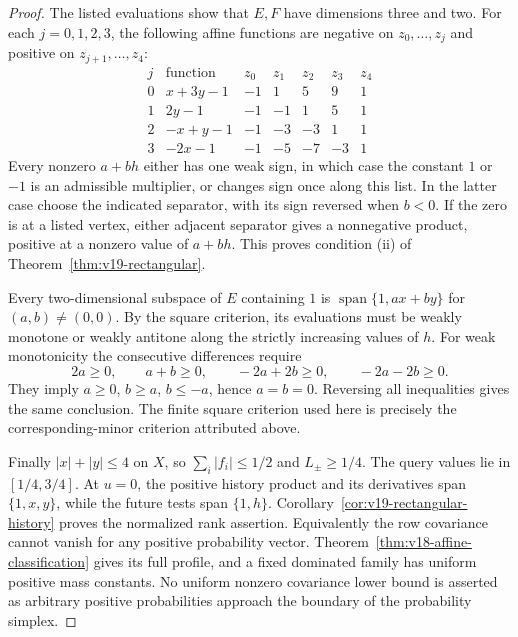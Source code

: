 \begin{proof}
The listed evaluations show that $E,F$ have dimensions three and two.
For each $j=0,1,2,3$, the following affine functions are negative on
$z_0,\ldots,z_j$ and positive on $z_{j+1},\ldots,z_4$:
\[
 \begin{array}{c|c|rrrrr}
 j&\text{function}&z_0&z_1&z_2&z_3&z_4\\\hline
 0&x+3y-1&-1&1&5&9&1\\
 1&2y-1&-1&-1&1&5&1\\
 2&-x+y-1&-1&-3&-3&1&1\\
 3&-2x-1&-1&-5&-7&-3&1
 \end{array}
\]
Every nonzero $a+bh$ either has one weak sign, in which case the
constant $1$ or $-1$ is an admissible multiplier, or changes sign once
along this list. In the latter case choose the indicated separator,
with its sign reversed when $b<0$. If the zero is at a listed vertex,
either adjacent separator gives a nonnegative product, positive at a
nonzero value of $a+bh$. This proves condition (ii) of
Theorem~\ref{thm:v19-rectangular}.

Every two-dimensional subspace of $E$ containing $1$ is
$\operatorname{span}\{1,ax+by\}$ for $(a,b)\ne(0,0)$.
By the square criterion, its evaluations must be weakly monotone or
weakly antitone along the strictly increasing values of $h$.
For weak monotonicity the consecutive differences require
\[
 2a\ge0,\qquad a+b\ge0,\qquad -2a+2b\ge0,
 \qquad -2a-2b\ge0.
\]
They imply $a\ge0$, $b\ge a$, $b\le-a$, hence $a=b=0$.
Reversing all inequalities gives the same conclusion. The finite
square criterion used here is precisely the corresponding-minor
criterion attributed above.

Finally $|x|+|y|\le4$ on $X$, so $\sum_i|f_i|\le1/2$ and
$L_\pm\ge1/4$. The query values lie in $[1/4,3/4]$.
At $u=0$, the positive history product and its derivatives span
$\{1,x,y\}$, while the future tests span $\{1,h\}$.
Corollary~\ref{cor:v19-rectangular-history} proves the normalized
rank assertion. Equivalently the row covariance cannot vanish for
any positive probability vector. Theorem~\ref{thm:v18-affine-classification}
gives its full profile, and a fixed dominated family has uniform
positive mass constants. No uniform nonzero covariance lower bound
is asserted as arbitrary positive probabilities approach the boundary
of the probability simplex.
\end{proof}
